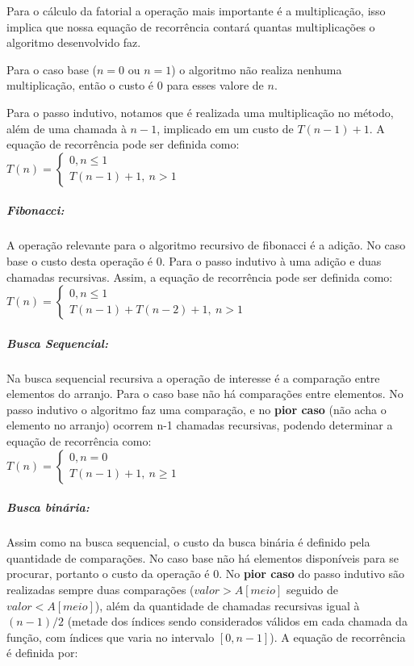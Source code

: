 \documentclass[a4paper, twocolumn]{article}
\theoremstyle{definition}
\begin{document}
Para o cálculo da fatorial a operação mais importante é a multiplicação, isso implica que nossa equação de recorrência contará quantas multiplicações o algoritmo desenvolvido faz.

Para o caso base ($n = 0$ ou $n = 1$) o algoritmo não realiza nenhuma multiplicação, então o custo é 0 para esses valore de $n$. 

Para o passo indutivo, notamos que é realizada uma multiplicação no método, além de uma chamada à $n-1$, implicado em um custo de $T(n-1) + 1$. A equação de recorrência pode ser definida como: \\

$T(n) = \begin{cases} 
	0, n \leq 1\\
	T(n-1) + 1, \ n > 1
	\end{cases}$

\subparagraph{Fibonacci:}
A operação relevante para o algoritmo recursivo de fibonacci é a adição. No caso base o custo desta operação é 0. Para o passo indutivo à uma adição e duas chamadas recursivas. Assim, a equação de recorrência pode ser definida como: \\

$T(n) = \begin{cases} 
	0, n \leq 1\\
	T(n-1) + T(n-2) + 1, \ n > 1
\end{cases}$

\subparagraph{Busca Sequencial:}
Na busca sequencial recursiva a operação de interesse é a comparação entre elementos do arranjo. Para o caso base não há comparações entre elementos. No passo indutivo o algoritmo faz uma comparação, e no \textbf{pior caso} (não acha o elemento no arranjo) ocorrem n-1 chamadas recursivas, podendo determinar a equação de recorrência como: \\

$T(n) = \begin{cases} 
	0, n  = 0\\
	T(n-1) + 1, \ n \geq 1
\end{cases}$

\subparagraph{Busca binária:}
Assim como na busca sequencial, o custo da busca binária é definido pela quantidade de comparações. No caso base não há elementos disponíveis para se procurar, portanto o custo da operação é 0. No \textbf{pior caso} do passo indutivo são realizadas sempre duas comparações ($valor > A[meio]$ seguido de $valor < A[meio]$), além da quantidade de chamadas recursivas igual à $(n-1) / 2$ (metade dos índices sendo considerados válidos em cada chamada da função, com índices que varia no intervalo $[0,n-1]$). A equação de recorrência é definida por: \\
\end{document}
